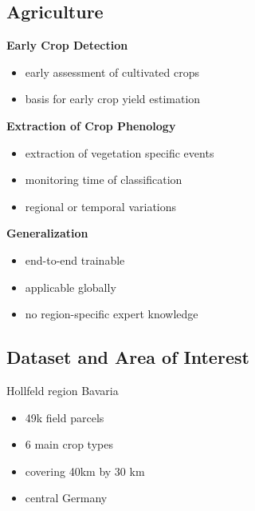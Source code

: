 \documentclass[a0]{tumposter}
\begin{document}
\begin{minipage}[t]{.65\textwidth}
	\begin{minipage}[t]{.5\textwidth}
	\subsection{Agriculture}
	
	\small
	
	\vspace{1em}
	
		\textbf{Early Crop Detection}
		\begin{itemize}
			\item early assessment of cultivated crops
			\item basis for early crop yield estimation
		\end{itemize}
		\vspace{.3em}
		
		\textbf{Extraction of Crop Phenology}
		\begin{itemize}
			\item extraction of vegetation specific events 
			\item monitoring time of classification
			\item regional or temporal variations
		\end{itemize}
		\vspace{.3em}
		
		\textbf{Generalization}
		\begin{itemize}
			\item end-to-end trainable
			\item applicable globally
			\item no region-specific expert knowledge
		\end{itemize}
	
	\end{minipage}
	\begin{minipage}[t]{.49\textwidth}
	\subsection{Dataset and Area of Interest} \par
	\begin{minipage}{.6\textwidth}
		\small
		\vspace{1em}
		Hollfeld region Bavaria
		\begin{itemize}
			\item 49k field parcels
			\item 6 main crop types
			\item covering 40km by 30 km
			\item central Germany
		\end{itemize}
		

\end{minipage}
\end{minipage}
\end{minipage}
\end{document}
